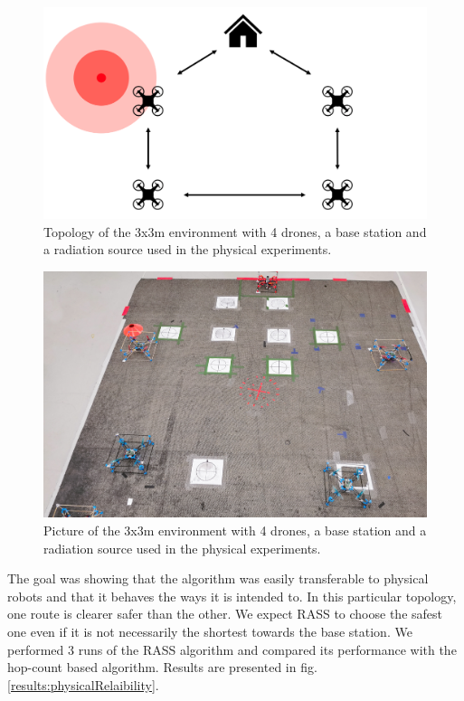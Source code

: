 \begin{figure}[h]
	\centering
    \includegraphics[width=0.7\columnwidth]{images/physical-topology.png}
    \caption{Topology of the 3x3m environment with 4 drones, a base station and a radiation source used in the physical experiments.}
    \label{cogniflyExperiment1}
\end{figure}

\begin{figure}[h]
	\centering
    \includegraphics[width=0.64\columnwidth]{images/cognifly.jpg}
    \caption{Picture of the 3x3m environment with 4 drones, a base station and a radiation source used in the physical experiments.}
    \label{cogniflyExperiment2}
\end{figure}

The goal was showing that the algorithm was easily transferable to physical robots and that it behaves the ways it is intended to. In this particular topology, one route is clearer safer than the other. We expect RASS to choose the safest one even if it is not necessarily the shortest towards the base station. We performed 3 runs of the RASS algorithm and compared its performance with the hop-count based algorithm. Results are presented in fig. \ref{results:physicalRelaibility}.

